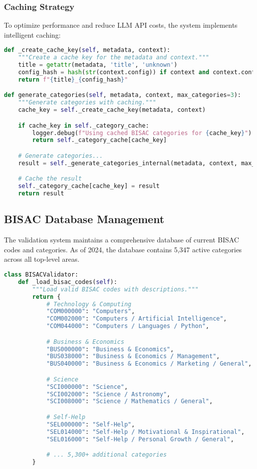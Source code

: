 \documentclass{article}
\begin{document}
\subsubsection{Caching Strategy}

To optimize performance and reduce LLM API costs, the system implements intelligent caching:

\begin{lstlisting}[language=python, caption=Caching Implementation]
def _create_cache_key(self, metadata, context):
    """Create a cache key for the metadata and context."""
    title = getattr(metadata, 'title', 'unknown')
    config_hash = hash(str(context.config)) if context and context.config else 0
    return f"{title}_{config_hash}"

def generate_categories(self, metadata, context, max_categories=3):
    """Generate categories with caching."""
    cache_key = self._create_cache_key(metadata, context)

    if cache_key in self._category_cache:
        logger.debug(f"Using cached BISAC categories for {cache_key}")
        return self._category_cache[cache_key]

    # Generate categories...
    result = self._generate_categories_internal(metadata, context, max_categories)

    # Cache the result
    self._category_cache[cache_key] = result
    return result
\end{lstlisting}

\subsection{BISAC Database Management}

The validation system maintains a comprehensive database of current BISAC codes and categories. As of 2024, the database contains 5,347 active categories across all top-level areas.

\begin{lstlisting}[language=python, caption=BISAC Database Structure]
class BISACValidator:
    def _load_bisac_codes(self):
        """Load valid BISAC codes with descriptions."""
        return {
            # Technology & Computing
            "COM000000": "Computers",
            "COM002000": "Computers / Artificial Intelligence",
            "COM044000": "Computers / Languages / Python",

            # Business & Economics
            "BUS000000": "Business & Economics",
            "BUS038000": "Business & Economics / Management",
            "BUS040000": "Business & Economics / Marketing / General",

            # Science
            "SCI000000": "Science",
            "SCI002000": "Science / Astronomy",
            "SCI008000": "Science / Mathematics / General",

            # Self-Help
            "SEL000000": "Self-Help",
            "SEL014000": "Self-Help / Motivational & Inspirational",
            "SEL016000": "Self-Help / Personal Growth / General",

            # ... 5,300+ additional categories
        }
\end{lstlisting}
\end{document}

